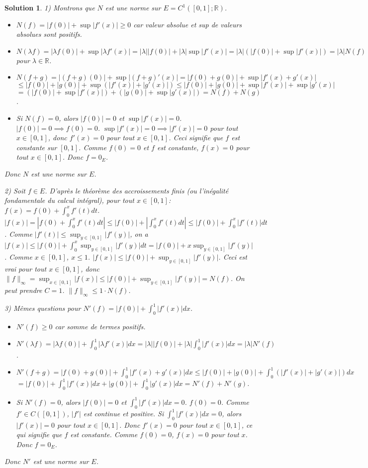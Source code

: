 \documentclass{article}
\newtheorem{solution}{Solution}
\begin{document}
\begin{solution}
1) Montrons que $N$ est une norme sur $E = C^1([0,1]; \mathbb{R})$.
\begin{itemize}
    \item $N(f) = |f(0)| + \sup |f'(x)| \geq 0$ car valeur absolue et sup de valeurs absolues sont positifs.
    \item $N(\lambda f) = |\lambda f(0)| + \sup |\lambda f'(x)| = |\lambda| |f(0)| + |\lambda| \sup |f'(x)| = |\lambda| (|f(0)| + \sup |f'(x)|) = |\lambda| N(f)$ pour $\lambda \in \mathbb{R}$.
    \item $N(f+g) = |(f+g)(0)| + \sup |(f+g)'(x)| = |f(0) + g(0)| + \sup |f'(x) + g'(x)|$
    $\leq |f(0)| + |g(0)| + \sup (|f'(x)| + |g'(x)|) \leq |f(0)| + |g(0)| + \sup |f'(x)| + \sup |g'(x)|$
    $= (|f(0)| + \sup |f'(x)|) + (|g(0)| + \sup |g'(x)|) = N(f) + N(g)$.
    \item Si $N(f) = 0$, alors $|f(0)| = 0$ et $\sup |f'(x)| = 0$.
    $|f(0)| = 0 \implies f(0) = 0$.
    $\sup |f'(x)| = 0 \implies |f'(x)| = 0$ pour tout $x \in [0,1]$, donc $f'(x) = 0$ pour tout $x \in [0,1]$.
    Ceci signifie que $f$ est constante sur $[0,1]$.
    Comme $f(0)=0$ et $f$ est constante, $f(x) = 0$ pour tout $x \in [0,1]$. Donc $f = 0_E$.
\end{itemize}
Donc $N$ est une norme sur $E$.

2) Soit $f \in E$. D'après le théorème des accroissements finis (ou l'inégalité fondamentale du calcul intégral), pour tout $x \in [0,1]$:
$f(x) = f(0) + \int_0^x f'(t) dt$.
$|f(x)| = |f(0) + \int_0^x f'(t) dt| \leq |f(0)| + |\int_0^x f'(t) dt| \leq |f(0)| + \int_0^x |f'(t)| dt$.
Comme $|f'(t)| \leq \sup_{y \in [0,1]} |f'(y)|$, on a
$|f(x)| \leq |f(0)| + \int_0^x \sup_{y \in [0,1]} |f'(y)| dt = |f(0)| + x \sup_{y \in [0,1]} |f'(y)|$.
Comme $x \in [0,1]$, $x \leq 1$.
$|f(x)| \leq |f(0)| + \sup_{y \in [0,1]} |f'(y)|$.
Ceci est vrai pour tout $x \in [0,1]$, donc
$\|f\|_\infty = \sup_{x \in [0,1]} |f(x)| \leq |f(0)| + \sup_{y \in [0,1]} |f'(y)| = N(f)$.
On peut prendre $C=1$. $\|f\|_\infty \leq 1 \cdot N(f)$.

3) Mêmes questions pour $N'(f) = |f(0)| + \int_0^1 |f'(x)| dx$.
\begin{itemize}
    \item $N'(f) \geq 0$ car somme de termes positifs.
    \item $N'(\lambda f) = |\lambda f(0)| + \int_0^1 |\lambda f'(x)| dx = |\lambda| |f(0)| + |\lambda| \int_0^1 |f'(x)| dx = |\lambda| N'(f)$.
    \item $N'(f+g) = |f(0)+g(0)| + \int_0^1 |f'(x)+g'(x)| dx \leq |f(0)|+|g(0)| + \int_0^1 (|f'(x)|+|g'(x)|) dx$
    $= |f(0)| + \int_0^1 |f'(x)| dx + |g(0)| + \int_0^1 |g'(x)| dx = N'(f) + N'(g)$.
    \item Si $N'(f) = 0$, alors $|f(0)| = 0$ et $\int_0^1 |f'(x)| dx = 0$.
    $f(0) = 0$. Comme $f' \in C([0,1])$, $|f'|$ est continue et positive.
    Si $\int_0^1 |f'(x)| dx = 0$, alors $|f'(x)| = 0$ pour tout $x \in [0,1]$.
    Donc $f'(x)=0$ pour tout $x \in [0,1]$, ce qui signifie que $f$ est constante.
    Comme $f(0)=0$, $f(x)=0$ pour tout $x$. Donc $f=0_E$.
\end{itemize}
Donc $N'$ est une norme sur $E$.


\end{solution}
\end{document}

